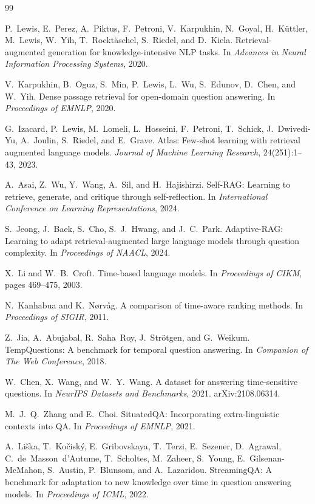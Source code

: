 \documentclass[11pt,letterpaper]{article}
\begin{document}
\begin{thebibliography}{99}

P.~Lewis, E.~Perez, A.~Piktus, F.~Petroni, V.~Karpukhin, N.~Goyal, H.~K\"uttler, M.~Lewis, W.~Yih, T.~Rockt\"aschel, S.~Riedel, and D.~Kiela.
Retrieval-augmented generation for knowledge-intensive NLP tasks.
In \emph{Advances in Neural Information Processing Systems}, 2020.

V.~Karpukhin, B.~Oguz, S.~Min, P.~Lewis, L.~Wu, S.~Edunov, D.~Chen, and W.~Yih.
Dense passage retrieval for open-domain question answering.
In \emph{Proceedings of EMNLP}, 2020.

G.~Izacard, P.~Lewis, M.~Lomeli, L.~Hosseini, F.~Petroni, T.~Schick, J.~Dwivedi-Yu, A.~Joulin, S.~Riedel, and E.~Grave.
Atlas: Few-shot learning with retrieval augmented language models.
\emph{Journal of Machine Learning Research}, 24(251):1--43, 2023.

A.~Asai, Z.~Wu, Y.~Wang, A.~Sil, and H.~Hajishirzi.
Self-RAG: Learning to retrieve, generate, and critique through self-reflection.
In \emph{International Conference on Learning Representations}, 2024.

S.~Jeong, J.~Baek, S.~Cho, S.~J.~Hwang, and J.~C.~Park.
Adaptive-RAG: Learning to adapt retrieval-augmented large language models through question complexity.
In \emph{Proceedings of NAACL}, 2024.

X.~Li and W.~B.~Croft.
Time-based language models.
In \emph{Proceedings of CIKM}, pages 469--475, 2003.

N.~Kanhabua and K.~N{\o}rv{\aa}g.
A comparison of time-aware ranking methods.
In \emph{Proceedings of SIGIR}, 2011.

Z.~Jia, A.~Abujabal, R.~Saha~Roy, J.~Str\"otgen, and G.~Weikum.
TempQuestions: A benchmark for temporal question answering.
In \emph{Companion of The Web Conference}, 2018.

W.~Chen, X.~Wang, and W.~Y.~Wang.
A dataset for answering time-sensitive questions.
In \emph{NeurIPS Datasets and Benchmarks}, 2021.
arXiv:2108.06314.

M.~J.~Q.~Zhang and E.~Choi.
SituatedQA: Incorporating extra-linguistic contexts into QA.
In \emph{Proceedings of EMNLP}, 2021.

A.~Li\v{s}ka, T.~Ko\v{c}isk\'y, E.~Gribovskaya, T.~Terzi, E.~Sezener, D.~Agrawal, C.~de~Masson~d'Autume, T.~Scholtes, M.~Zaheer, S.~Young, E.~Gilsenan-McMahon, S.~Austin, P.~Blunsom, and A.~Lazaridou.
StreamingQA: A benchmark for adaptation to new knowledge over time in question answering models.
In \emph{Proceedings of ICML}, 2022.


\end{thebibliography}
\end{document}
